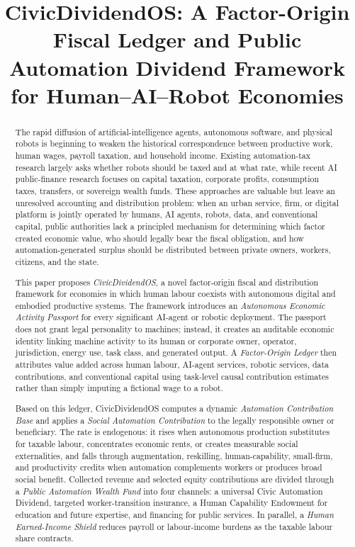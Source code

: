 \documentclass[conference]{IEEEtran}
\title{CivicDividendOS: A Factor-Origin Fiscal Ledger and Public Automation Dividend Framework for Human--AI--Robot Economies}
\author{\IEEEauthorblockN{Author Name}
\IEEEauthorblockA{Affiliation\\Email}}
\begin{document}
\maketitle

\begin{abstract}
The rapid diffusion of artificial-intelligence agents, autonomous software, and physical robots is beginning to weaken the historical correspondence between productive work, human wages, payroll taxation, and household income. Existing automation-tax research largely asks whether robots should be taxed and at what rate, while recent AI public-finance research focuses on capital taxation, corporate profits, consumption taxes, transfers, or sovereign wealth funds. These approaches are valuable but leave an unresolved accounting and distribution problem: when an urban service, firm, or digital platform is jointly operated by humans, AI agents, robots, data, and conventional capital, public authorities lack a principled mechanism for determining which factor created economic value, who should legally bear the fiscal obligation, and how automation-generated surplus should be distributed between private owners, workers, citizens, and the state.

This paper proposes \textit{CivicDividendOS}, a novel factor-origin fiscal and distribution framework for economies in which human labour coexists with autonomous digital and embodied productive systems. The framework introduces an \textit{Autonomous Economic Activity Passport} for every significant AI-agent or robotic deployment. The passport does not grant legal personality to machines; instead, it creates an auditable economic identity linking machine activity to its human or corporate owner, operator, jurisdiction, energy use, task class, and generated output. A \textit{Factor-Origin Ledger} then attributes value added across human labour, AI-agent services, robotic services, data contributions, and conventional capital using task-level causal contribution estimates rather than simply imputing a fictional wage to a robot.

Based on this ledger, CivicDividendOS computes a dynamic \textit{Automation Contribution Base} and applies a \textit{Social Automation Contribution} to the legally responsible owner or beneficiary. The rate is endogenous: it rises when autonomous production substitutes for taxable labour, concentrates economic rents, or creates measurable social externalities, and falls through augmentation, reskilling, human-capability, small-firm, and productivity credits when automation complements workers or produces broad social benefit. Collected revenue and selected equity contributions are divided through a \textit{Public Automation Wealth Fund} into four channels: a universal Civic Automation Dividend, targeted worker-transition insurance, a Human Capability Endowment for education and future expertise, and financing for public services. In parallel, a \textit{Human Earned-Income Shield} reduces payroll or labour-income burdens as the taxable labour share contracts.


\end{abstract}
\end{document}
